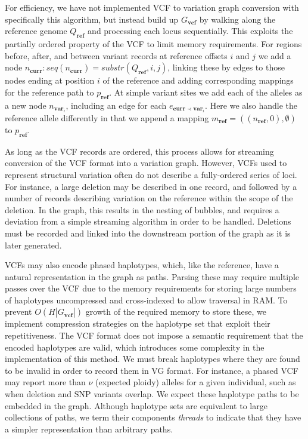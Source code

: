 For efficiency, we have not implemented VCF to variation graph conversion with specifically this algorithm, but instead build up $G_\textbf{vcf}$ by walking along the reference genome $Q_\textbf{ref}$ and processing each locus sequentially.
This exploits the partially ordered property of the VCF to limit memory requirements.
For regions before, after, and between variant records at reference offsets $i$ and $j$ we add a node $n_\textbf{curr} : seq(n_\textbf{curr}) = substr(Q_\textbf{ref}, i, j)$, linking these by edges to those nodes ending at position $i$ of the reference and adding corresponding mappings for the reference path to $p_\textbf{ref}$.
At simple variant sites we add each of the alleles as a new node $n_{\textbf{var}_i}$, including an edge for each $e_{\textbf{curr} \prec \textbf{var}_i}$.
Here we also handle the reference allele differently in that we append a mapping $m_\textbf{ref} = ((n_\textbf{ref}, 0), \emptyset)$ to $p_\textbf{ref}$.

As long as the VCF records are ordered, this process allows for streaming conversion of the VCF format into a variation graph.
However, VCFs used to represent structural variation often do not describe a fully-ordered series of loci.
For instance, a large deletion may be described in one record, and followed by a number of records describing variation on the reference within the scope of the deletion.
In the graph, this results in the nesting of bubbles, and requires a deviation from a simple streaming algorithm in order to be handled.
Deletions must be recorded and linked into the downstream portion of the graph as it is later generated.

VCFs may also encode phased haplotypes, which, like the reference, have a natural representation in the graph as paths.
Parsing these may require multiple passes over the VCF due to the memory requirements for storing large numbers of haplotypes uncompressed and cross-indexed to allow traversal in RAM.
To prevent $O(H|G_\textbf{vcf}|)$ growth of the required memory to store these, we implement compression strategies on the haplotype set that exploit their repetitiveness.
The VCF format does not impose a semantic requirement that the encoded haplotypes are valid, which introduces some complexity in the implementation of this method.
We must break haplotypes where they are found to be invalid in order to record them in VG format.
For instance, a phased VCF may report more than $\nu$ (expected ploidy) alleles for a given individual, such as when deletion and SNP variants overlap.
We expect these haplotype paths to be embedded in the graph.
Although haplotype sets are equivalent to large collections of paths, we term their components \emph{threads} to indicate that they have a simpler representation than arbitrary paths.

